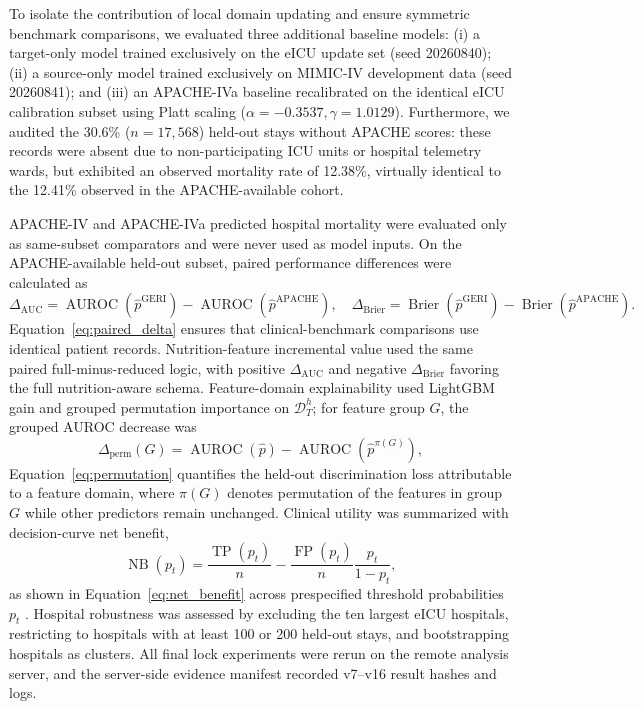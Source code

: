 \documentclass[utf8]{FrontiersinVancouver}
\newcommand{\re}[1]{#1}
\begin{document}
\re{To isolate the contribution of local domain updating and ensure symmetric benchmark comparisons, we evaluated three additional baseline models: (i) a target-only model trained exclusively on the eICU update set (seed 20260840); (ii) a source-only model trained exclusively on MIMIC-IV development data (seed 20260841); and (iii) an APACHE-IVa baseline recalibrated on the identical eICU calibration subset using Platt scaling ($\alpha = -0.3537, \gamma = 1.0129$). Furthermore, we audited the 30.6\% ($n=17,568$) held-out stays without APACHE scores: these records were absent due to non-participating ICU units or hospital telemetry wards, but exhibited an observed mortality rate of 12.38\%, virtually identical to the 12.41\% observed in the APACHE-available cohort.}

APACHE-IV and APACHE-IVa predicted hospital mortality were evaluated only as same-subset comparators and were never used as model inputs. On the APACHE-available held-out subset, paired performance differences were calculated as
\begin{equation}
\Delta_{\mathrm{AUC}}=\operatorname{AUROC}(\hat{p}^{\mathrm{GERI}})-\operatorname{AUROC}(\hat{p}^{\mathrm{APACHE}}),\quad
\Delta_{\mathrm{Brier}}=\operatorname{Brier}(\hat{p}^{\mathrm{GERI}})-\operatorname{Brier}(\hat{p}^{\mathrm{APACHE}}).
\label{eq:paired_delta}
\end{equation}
Equation~\ref{eq:paired_delta} ensures that clinical-benchmark comparisons use identical patient records. Nutrition-feature incremental value used the same paired full-minus-reduced logic, with positive $\Delta_{\mathrm{AUC}}$ and negative $\Delta_{\mathrm{Brier}}$ favoring the full nutrition-aware schema. Feature-domain explainability used LightGBM gain and grouped permutation importance on $\mathcal{D}_{T}^{h}$; for feature group $G$, the grouped AUROC decrease was
\begin{equation}
\Delta_{\mathrm{perm}}(G)=\operatorname{AUROC}(\hat{p})-\operatorname{AUROC}(\hat{p}^{\pi(G)}),
\label{eq:permutation}
\end{equation}
Equation~\ref{eq:permutation} quantifies the held-out discrimination loss attributable to a feature domain, where $\pi(G)$ denotes permutation of the features in group $G$ while other predictors remain unchanged. Clinical utility was summarized with decision-curve net benefit,
\begin{equation}
\operatorname{NB}(p_t)=\frac{\operatorname{TP}(p_t)}{n}-\frac{\operatorname{FP}(p_t)}{n}\frac{p_t}{1-p_t},
\label{eq:net_benefit}
\end{equation}
as shown in Equation~\ref{eq:net_benefit} across prespecified threshold probabilities $p_t$ \citep{Vickers2006DCA}. Hospital robustness was assessed by excluding the ten largest eICU hospitals, restricting to hospitals with at least 100 or 200 held-out stays, and bootstrapping hospitals as clusters. All final lock experiments were rerun on the remote analysis server, and the server-side evidence manifest recorded v7--v16 result hashes and logs.
\end{document}
